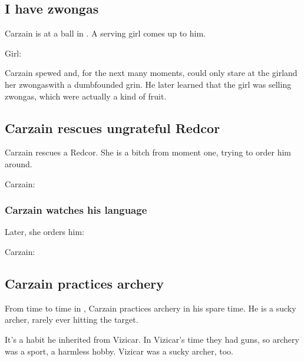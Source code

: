 \subsection{I have zwongas}
Carzain is at a ball in \Redce. 
A serving girl comes up to him. 

Girl: 

Carzain spewed and, for the next many moments, could only stare at the girl\dash and her zwongas\dash with a dumbfounded grin. 
He later learned that the girl was selling zwongas, which were actually a kind of fruit. 









\subsection{Carzain rescues ungrateful Redcor}
Carzain rescues a Redcor. 
She is a bitch from moment one, trying to order him around. 

Carzain: 








\subsubsection{Carzain watches his language}
Later, she orders him: 

Carzain: 







\subsection{Carzain practices archery}
From time to time in \Redce, Carzain practices archery in his spare time. 
He is a sucky archer, rarely ever hitting the target. 

It's a habit he inherited from Vizicar. 
In Vizicar's time they had guns, so archery was a sport, a harmless hobby. 
Vizicar was a sucky archer, too. 







